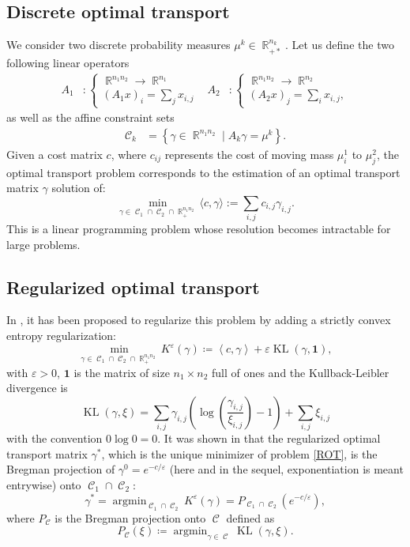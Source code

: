 \documentclass{article} %
\newcommand{\scal}[2]{\left\langle #1 , #2 \right\rangle}
\DeclareMathOperator{\IR}{\mathbb{R}}
\DeclareMathOperator*{\argmin}{argmin}
\DeclareMathOperator{\Ccal}{\mathcal{C}}
\DeclareMathOperator{\KL}{KL}
\renewcommand{\epsilon}{\varepsilon}
\theoremstyle{plain}
\theoremstyle{definition}
\theoremstyle{remark}
\begin{document}
 
\subsection{Discrete optimal transport}
We consider two discrete probability measures $\mu^k \in \IR_{+*}^{n_k}$.
Let us define the two following linear operators
\begin{align*}
A_1 &: \begin{cases}
\IR^{n_1 n_2} \rightarrow \IR^{n_1} \\
(A_1 x)_i = \sum_j x_{i,j}
\end{cases} &
A_2 &: \begin{cases}
\IR^{n_1 n_2} \rightarrow \IR^{n_2}\\
(A_2 x)_j = \sum_i x_{i,j},
\end{cases}
\end{align*}
as well as the affine constraint sets
\begin{align*}
\Ccal_k &= \left\{ \gamma\in\IR^{n_1 n_2} \mid A_k \gamma = \mu^k \right\}.
\end{align*}
Given a cost matrix $c$, where $c_{ij}$ represents the cost of moving mass $\mu^1_i$ to $\mu^2_j$,  the optimal transport problem corresponds to the estimation of an optimal transport matrix $\gamma$ solution of:
$$\min_{\gamma\in\Ccal_1\cap \Ccal_2\cap \IR^{n_1 n_2}_+} \langle c,\gamma\rangle:=\sum_{i,j}c_{i,j}\gamma_{i,j}.$$
This is a linear programming problem whose resolution becomes intractable for large problems.

\subsection{Regularized optimal transport}

In \cite{cuturi13}, it has been proposed to regularize this problem by adding a strictly convex entropy regularization:
\begin{equation}\label{ROT}
\min_{\gamma\in\Ccal_1\cap \Ccal_2\cap \IR^{n_1 n_2}_{+}}K^\epsilon(\gamma) \coloneqq \scal{c}{\gamma} 
+ \epsilon \KL(\gamma,\mathbf{1})
,\end{equation}
with $\epsilon>0$, $\mathbf{1}$ is the matrix of size $n_1\times n_2$ full of ones and the Kullback-Leibler divergence is
\begin{equation}\label{KL}
\KL(\gamma,\xi) = \sum_{i,j} \gamma_{i,j} \left( \log \left( \frac{\gamma_{i,j}}{\xi_{i,j}} \right) -1  \right) + \sum_{i,j} \xi_{i,j}
\end{equation}
with the convention $0 \log 0= 0$. It was shown in \cite{benamou15}  that the regularized optimal transport matrix $\gamma^*$, which is the unique minimizer of problem \eqref{ROT},  is the Bregman projection of $\gamma^0 = e^{-c/\epsilon}$ (here and in the sequel, exponentiation is meant entrywise) onto $\Ccal_1 \cap \Ccal_2$:
\begin{equation}\label{eq:reg_ot_pb}
\gamma^* = \argmin_{\Ccal_1 \cap \Ccal_2} K^\epsilon(\gamma)= P_{\Ccal_1 \cap \Ccal_2} (e^{-c/\epsilon}),
\end{equation}
where $P_{\Ccal}$ is the  Bregman projection onto $\Ccal$ defined as
\[
P_{\Ccal}(\xi) \coloneqq \argmin_{\gamma \in \Ccal} \KL(\gamma,\xi).
\]
\end{document}
